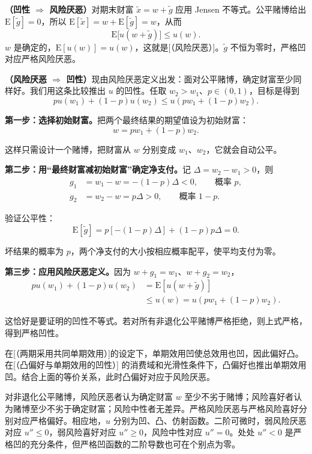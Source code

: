 \begin{solution}[label-content={证明},blank-type=none]
\textbf{（凹性 $\Rightarrow$ 风险厌恶）}对期末财富 $\tilde{x}=w+\tilde{g}$ 应用 Jensen 不等式。公平赌博给出 $\mathrm{E}[\tilde{g}]=0$，所以 $\mathrm{E}[\tilde{x}]=w+\mathrm{E}[\tilde{g}]=w$，从而
\[
    \mathrm{E}\bigl[u(w+\tilde{g})\bigr]\le u(w).
\]
$w$ 是确定的，$\mathrm{E}[u(w)]=u(w)$，这就是[（风险厌恶）]。$\tilde{g}$ 不恒为零时，严格凹对应严格风险厌恶。

\textbf{（风险厌恶 $\Rightarrow$ 凹性）}现由风险厌恶定义出发：面对公平赌博，确定财富至少同样好。我们用这条比较推出 $u$ 的凹性。任取 $w_2>w_1$、$p\in(0,1)$，目标是得到
\[
 pu(w_1)+(1-p)u(w_2)\le u(pw_1+(1-p)w_2).
\]

\textbf{第一步：选择初始财富。}把两个最终结果的期望值设为初始财富：
\[
 w=pw_1+(1-p)w_2.
\]

这样只需设计一个赌博，把财富从 $w$ 分别变成 $w_1$、$w_2$，它就会自动公平。

\textbf{第二步：用“最终财富减初始财富”确定净支付。}记 $\Delta=w_2-w_1>0$，则
\[
\begin{aligned}
 g_1&=w_1-w=-(1-p)\Delta<0,\qquad\text{概率 }p,\\
 g_2&=w_2-w=p\Delta>0,\qquad\text{概率 }1-p.
\end{aligned}
\]

验证公平性：
\[
 \mathrm E[\tilde g]=p[-(1-p)\Delta]+(1-p)p\Delta=0.
\]

坏结果的概率为 $p$，两个净支付的大小按相应概率配平，使平均支付为零。

\textbf{第三步：应用风险厌恶定义。}因为 $w+g_1=w_1$、$w+g_2=w_2$，
\[
\begin{aligned}
 pu(w_1)+(1-p)u(w_2)
 &=\mathrm E[u(w+\tilde g)]\\
 &\le u(w)=u(pw_1+(1-p)w_2).
\end{aligned}
\]

这恰好是要证明的凹性不等式。若对所有非退化公平赌博严格拒绝，则上式严格，得到严格凹性。
\end{solution}

在[（两期采用共同单期效用）]的设定下，单期效用凹使总效用也凹，因此偏好凸。在[（凸偏好与单期效用的凹性）] 的消费域和光滑性条件下，凸偏好也推出单期效用凹。结合上面的等价关系，此时凸偏好对应于风险厌恶。

\begin{tcolorbox}[knowledge,title=三种风险态度]
对非退化公平赌博，风险厌恶者认为确定财富 $w$ 至少不劣于赌博；风险喜好者认为赌博至少不劣于确定财富；风险中性者无差异。严格风险厌恶与严格风险喜好分别对应严格偏好。相应地，$u$ 分别为凹、凸、仿射函数。二阶可微时，弱风险厌恶对应 $u''\le0$，弱风险喜好对应 $u''\ge0$，风险中性对应 $u''=0$。处处 $u''<0$ 是严格凹的充分条件，但严格凹函数的二阶导数也可在个别点为零。
\end{tcolorbox}

